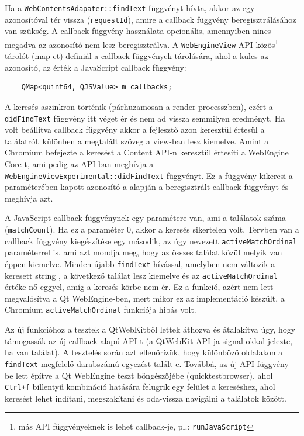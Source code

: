 \documentclass[12pt]{report}
\begin{document}
Ha a \texttt{WebContentsAdapater::findText} függvényt hívta, akkor az egy azonosítóval
tér vissza (\texttt{requestId}), amire a callback függvény beregisztrálásához van szükség.
A callback függvény használata opcionális, amennyiben nincs megadva az azonosító nem lesz
beregisztrálva. A \texttt{WebEngineView} API közös\footnote{más API függvényeknek is lehet
callback-je, pl.: \texttt{runJavaScript}} tárolót (map-et) definiál a callback függvények
tárolására, ahol a kulcs az azonosító, az érték a JavaScript callback függvény:
\begin{verbatim}
    QMap<quint64, QJSValue> m_callbacks;
\end{verbatim}
A keresés aszinkron történik (párhuzamosan a render processzben), ezért a
\texttt{didFindText} függvény itt véget ér és nem ad vissza semmilyen eredményt. Ha volt
beállítva callback függvény akkor a fejlesztő azon keresztül értesül a találatról, különben
a megtalált szöveg a view-ban lesz kiemelve. Amint a Chromium befejezte a keresést a
Content API-n keresztül értesíti a WebEngine Core-t, ami pedig az API-ban meghívja a
\texttt{WebEngineViewExperimental::didFindText} függvényt. Ez a függvény kikeresi a
paraméterében kapott azonosító a alapján a beregisztrált callback függvényt és meghívja azt.

A JavaScript callback függvénynek egy paramétere van, ami a találatok
száma (\texttt{matchCount}). Ha ez a paraméter 0, akkor a keresés sikertelen volt.
Tervben van a callback függvény kiegészítése egy második, az úgy nevezett
\texttt{activeMatchOrdinal} paraméterrel is, ami azt mondja meg, hogy az összes találat
közül melyik van éppen kiemelve. Minden újabb \texttt{findText} hívással, amelyben nem
változik a keresett string , a következő találat lesz kiemelve és az
\texttt{activeMatchOrdinal} értéke nő eggyel, amíg a keresés körbe nem ér.
Ez a funkció, azért nem lett megvalósítva a Qt WebEngine-ben, mert mikor
ez az implementáció készült, a Chromium \texttt{activeMatchOrdinal} funkciója hibás volt.

Az új funkcióhoz a tesztek a QtWebKitből lettek áthozva és átalakítva úgy, hogy
támogassák az új callback alapú API-t (a QtWebKit API-ja signal-okkal jelezte, ha van
találat). A tesztelés során azt ellenőrízük, hogy különböző oldalakon a \texttt{findText}
megfelelő darabszámú egyezést talált-e. Továbbá, az új API függvény be lett építve a
Qt WebEngine teszt böngészőjébe (quicktestbrowser), ahol \texttt{Ctrl+f} billentyű kombináció
hatására felugrik egy felület a kereséshez, ahol keresést lehet indítani, megszakítani és
oda-vissza navigálni a találatok között.
\end{document}

